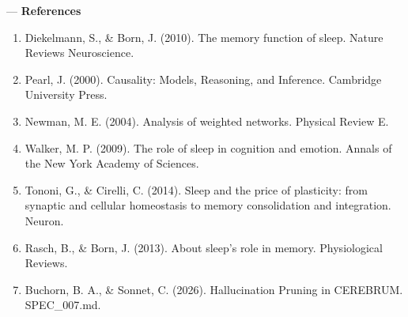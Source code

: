 ---
\textbf{References}
\begin{enumerate}
\item Diekelmann, S., \& Born, J. (2010). The memory function of sleep. Nature Reviews Neuros\-cience.
\item Pearl, J. (2000). Causality: Models, Reasoning, and Inference. Cambridge University Press.
\item Newman, M. E. (2004). Analysis of weighted networks. Physical Review E.
\item Walker, M. P. (2009). The role of sleep in cognition and emotion. Annals of the New York Academy of Sciences.
\item Tononi, G., \& Cirelli, C. (2014). Sleep and the price of plasticity: from synaptic and cellular homeostasis to memory conso\-lidation and integration. Neuron.
\item Rasch, B., \& Born, J. (2013). About sleep's role in memory. Physio\-logical Reviews.
\item Buchorn, B. A., \& Sonnet, C. (2026). Halluc\-ination Pruning in CEREBRUM. SPEC\_007.md.

\end{enumerate}
